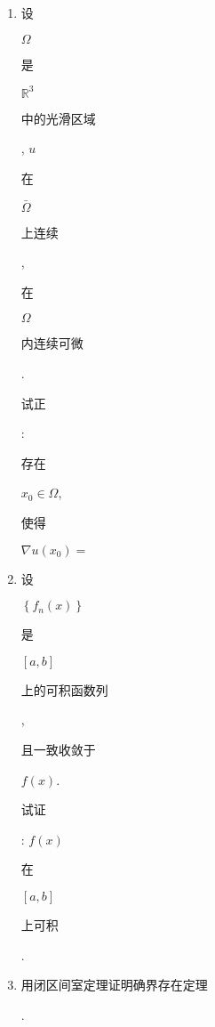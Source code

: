 \documentclass[10pt]{article}
\begin{document}
\begin{enumerate}
  \item \begin{CJK}{UTF8}{mj}设\end{CJK} $\Omega$ \begin{CJK}{UTF8}{mj}是\end{CJK} $\mathbb{R}^{3}$ \begin{CJK}{UTF8}{mj}中的光滑区域\end{CJK}, $u$ \begin{CJK}{UTF8}{mj}在\end{CJK} $\bar{\Omega}$ \begin{CJK}{UTF8}{mj}上连续\end{CJK}, \begin{CJK}{UTF8}{mj}在\end{CJK} $\Omega$ \begin{CJK}{UTF8}{mj}内连续可微\end{CJK}.\begin{CJK}{UTF8}{mj}试正\end{CJK}: \begin{CJK}{UTF8}{mj}存在\end{CJK} $x_{0} \in \Omega$, \begin{CJK}{UTF8}{mj}使得\end{CJK} $\nabla u\left(x_{0}\right)=$

  \item \begin{CJK}{UTF8}{mj}设\end{CJK} $\left\{f_{n}(x)\right\}$ \begin{CJK}{UTF8}{mj}是\end{CJK} $[a, b]$ \begin{CJK}{UTF8}{mj}上的可积函数列\end{CJK}, \begin{CJK}{UTF8}{mj}且一致收敛于\end{CJK} $f(x)$. \begin{CJK}{UTF8}{mj}试证\end{CJK}: $f(x)$ \begin{CJK}{UTF8}{mj}在\end{CJK} $[a, b]$ \begin{CJK}{UTF8}{mj}上可积\end{CJK}.

  \item \begin{CJK}{UTF8}{mj}用闭区间室定理证明确界存在定理\end{CJK}.

\end{enumerate}
\end{document}
